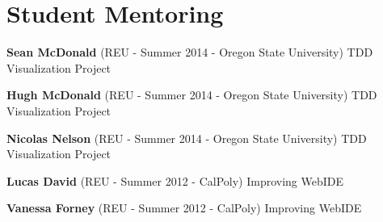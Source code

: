 \documentclass[10pt]{article}
\begin{document}
\section{Student Mentoring}
\begin{bibsection}
\setlength\itemsep{2pt}


\item \textbf{Sean McDonald } (REU - Summer 2014 - Oregon State University) TDD Visualization Project
\item \textbf{Hugh McDonald } (REU - Summer 2014 - Oregon State University) TDD Visualization Project
\item \textbf{Nicolas Nelson} (REU - Summer 2014 - Oregon State University) TDD Visualization Project
\item \textbf{Lucas David} (REU - Summer 2012 - CalPoly) Improving WebIDE
\item \textbf{Vanessa Forney} (REU - Summer 2012 - CalPoly) Improving WebIDE
\end{bibsection}
 \begin{comment}
\section{Software\\
 Skills}

Programming Languages:
%
\begin{innerlist}
    \item C, C$+$$+$, CSS, FLEX/AS3, HTML, Java, JavaScript, Perl, PHP,
        Lisp, SQL, MySQL, and others
\end{innerlist}

Design Concepts/Tools:
%
\begin{innerlist}
    \item AJAX, CogTool, Eclipse, Glasfish, Java EE, JavaDoc, NetBeans, Propel, SOAP, Symfony, UML
\end{innerlist}

\halfblankline

Server Technologies:
%
\begin{innerlist}
    \item Apache, Linux Administration, MySQL, Oracle, SpamAssassin, SQL Server, qmail, Zimbra Server 
\end{innerlist}

Productivity Applications:
%
\begin{innerlist}
    \item \TeX{} (\LaTeX{}, \BibTeX{}), Vim, MS Office, Apple iWork
\end{innerlist}

\halfblankline

Operating Systems:
%
\begin{innerlist}
    \item Apple Mac OS (System 7 - OS 10.8), including Mac OS X Server
    \item Windows (XP - 7), including Windows Server 2003, 2008 
    \item Linux (particularly CentOS and Debian), and most UNIX variants
    \end{innerlist}


\end{comment}
\end{document}
